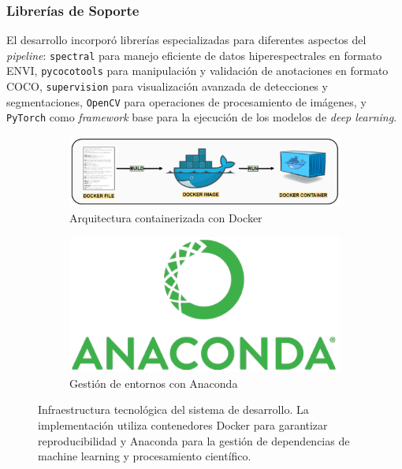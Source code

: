 \subsubsection{Librerías de Soporte}

El desarrollo incorporó librerías especializadas para diferentes aspectos del \emph{pipeline}: \texttt{spectral} para manejo eficiente de datos hiperespectrales en formato ENVI, \texttt{pycocotools} para manipulación y validación de anotaciones en formato COCO, \texttt{supervision} para visualización avanzada de detecciones y segmentaciones, \texttt{OpenCV} para operaciones de procesamiento de imágenes, y \texttt{PyTorch} como \emph{framework} base para la ejecución de los modelos de \emph{deep learning}.

\begin{figure}[!ht]
\centering
\begin{subfigure}[b]{0.45\textwidth}
    \includegraphics[width=\textwidth]{images/Docker2.png}
    \caption{Arquitectura containerizada con Docker}
    \label{fig:docker_arquitectura}
\end{subfigure}
\hfill
\begin{subfigure}[b]{0.45\textwidth}
    \includegraphics[width=\textwidth]{images/anaconda.png}
    \caption{Gestión de entornos con Anaconda}
    \label{fig:anaconda_entorno}
\end{subfigure}
\caption{Infraestructura tecnológica del sistema de desarrollo. La implementación utiliza contenedores Docker para garantizar reproducibilidad y Anaconda para la gestión de dependencias de machine learning y procesamiento científico.}
\label{fig:infraestructura_desarrollo}
\end{figure}

